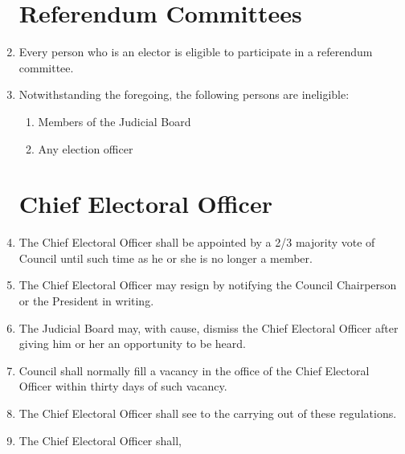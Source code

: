 \documentclass[oneside]{book}
\begin{document}
\begin{enumerate}
\section{\label{Referendum_Committees}Referendum Committees }
\item Every person who is an elector is eligible to participate in a referendum
committee. 
\item Notwithstanding the foregoing, the following persons are ineligible: 

\begin{enumerate}
\item Members of the Judicial Board 
\item Any election officer 
\end{enumerate}
\section{\label{Chief_Electoral_Officer}Chief Electoral Officer }
\item The Chief Electoral Officer shall be appointed by a 2/3 majority vote
of Council until such time as he or she is no longer a member. 
\item The Chief Electoral Officer may resign by notifying the Council Chairperson
or the President in writing. 
\item The Judicial Board may, with cause, dismiss the Chief Electoral Officer
after giving him or her an opportunity to be heard. 
\item Council shall normally fill a vacancy in the office of the Chief Electoral
Officer within thirty days of such vacancy. 
\item The Chief Electoral Officer shall see to the carrying out of these
regulations. 
\item The Chief Electoral Officer shall, 


\end{enumerate}
\end{document}
